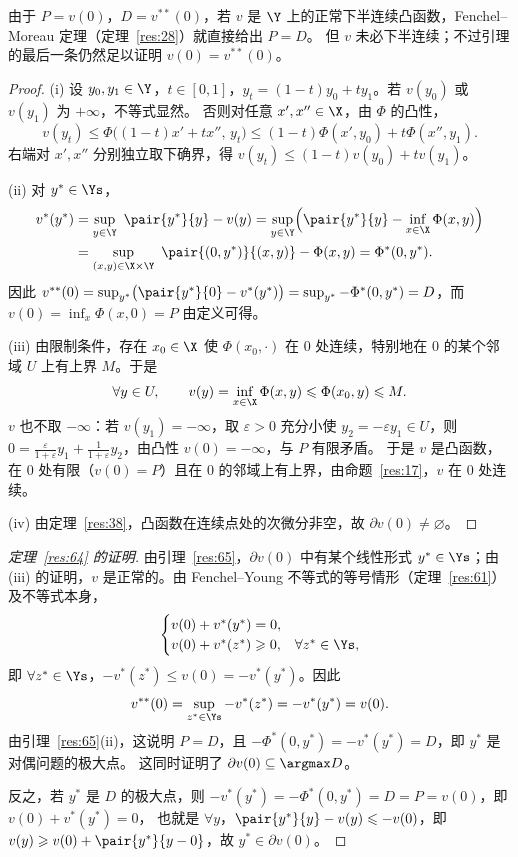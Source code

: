 由于 $P=v(0)$，$D=v^{**}(0)$，若 $v$ 是 $\Y$ 上的正常下半连续凸函数，Fenchel--Moreau 定理（定理~\ref{res:28}）就直接给出 $P=D$。
但 $v$ 未必下半连续；不过引理的最后一条仍然足以证明 $v(0)=v^{**}(0)$。

\begin{proof}
(i) 设 $y_0,y_1\in\Y$，$t\in[0,1]$，$y_t=(1-t)y_0+ty_1$。若 $v(y_0)$ 或 $v(y_1)$ 为 $+\infty$，不等式显然。
否则对任意 $x',x''\in\X$，由 $\Phi$ 的凸性，
\[
  v(y_t)\leqslant\Phi\bigl((1-t)x'+tx'',\,y_t\bigr)\leqslant(1-t)\Phi(x',y_0)+t\Phi(x'',y_1).
\]
右端对 $x',x''$ 分别独立取下确界，得 $v(y_t)\leqslant(1-t)v(y_0)+tv(y_1)$。

(ii) 对 $y^*\in\Ys$，
\[
  \begin{aligned}
  v^*(y^*)&=\sup_{y\in\Y}\ \pair{y^*}{y}-v(y)
  =\sup_{y\in\Y}\Bigl(\pair{y^*}{y}-\inf_{x\in\X}\Phi(x,y)\Bigr)\\
  &=\sup_{(x,y)\in\X\times\Y}\ \pair{(0,y^*)}{(x,y)}-\Phi(x,y)=\Phi^*(0,y^*).
  \end{aligned}
\]
因此 $v^{**}(0)=\sup_{y^*}\bigl(\pair{y^*}{0}-v^*(y^*)\bigr)=\sup_{y^*}-\Phi^*(0,y^*)=D$，而 $v(0)=\inf_x\Phi(x,0)=P$ 由定义可得。

(iii) 由限制条件，存在 $x_0\in\X$ 使 $\Phi(x_0,\cdot)$ 在 $0$ 处连续，特别地在 $0$ 的某个邻域 $U$ 上有上界 $M$。于是
\[
  \forall y\in U,\qquad v(y)=\inf_{x\in\X}\Phi(x,y)\leqslant\Phi(x_0,y)\leqslant M .
\]
$v$ 也不取 $-\infty$：若 $v(y_1)=-\infty$，取 $\varepsilon>0$ 充分小使 $y_2=-\varepsilon y_1\in U$，则
$0=\frac{\varepsilon}{1+\varepsilon}y_1+\frac1{1+\varepsilon}y_2$，由凸性 $v(0)=-\infty$，与 $P$ 有限矛盾。
于是 $v$ 是凸函数，在 $0$ 处有限（$v(0)=P$）且在 $0$ 的邻域上有上界，由命题~\ref{res:17}，$v$ 在 $0$ 处连续。

(iv) 由定理~\ref{res:38}，凸函数在连续点处的次微分非空，故 $\partial v(0)\neq\varnothing$。
\end{proof}

\begin{proof}[定理~\ref{res:64} 的证明]
由引理~\ref{res:65}，$\partial v(0)$ 中有某个线性形式 $y^*\in\Ys$；由 (iii) 的证明，$v$ 是正常的。由 Fenchel--Young 不等式的等号情形（定理~\ref{res:61}）及不等式本身，
\[
  \begin{cases}
    v(0)+v^*(y^*)=0,\\
    v(0)+v^*(z^*)\geqslant0, & \forall z^*\in\Ys,
  \end{cases}
\]
即 $\forall z^*\in\Ys$，$-v^*(z^*)\leqslant v(0)=-v^*(y^*)$。因此
\[
  v^{**}(0)=\sup_{z^*\in\Ys}-v^*(z^*)=-v^*(y^*)=v(0).
\]
由引理~\ref{res:65}(ii)，这说明 $P=D$，且 $-\Phi^*(0,y^*)=-v^*(y^*)=D$，即 $y^*$ 是对偶问题的极大点。
这同时证明了 $\partial v(0)\subseteq\argmax D$。

反之，若 $y^*$ 是 $D$ 的极大点，则 $-v^*(y^*)=-\Phi^*(0,y^*)=D=P=v(0)$，即 $v(0)+v^*(y^*)=0$，
也就是 $\forall y$，$\pair{y^*}{y}-v(y)\leqslant-v(0)$，即 $v(y)\geqslant v(0)+\pair{y^*}{y-0}$，故 $y^*\in\partial v(0)$。
\end{proof}

